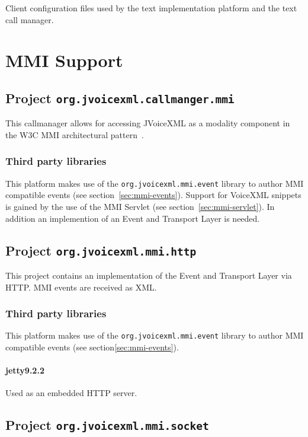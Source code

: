 \documentclass[11pt,a4paper]{article}
\begin{document}
Client configuration files used by the text implementation platform and the text call manager.

\section {MMI Support}

\subsection{Project \texttt{org.jvoicexml.callmanger.mmi}}

This callmanager allows for accessing JVoiceXML as a modality component in
the W3C MMI architectural pattern~\cite{w3c:2012:mmi_arch}.

\subsubsection{Third party libraries}

This platform makes use of the \lstinline{org.jvoicexml.mmi.event} library
to author MMI compatible events (see section~\ref{sec:mmi-events}).
Support for VoiceXML snippets is gained by the use of the MMI Servlet
(see section~\ref{sec:mmi-servlet}).
In addition an implemention of an Event and Transport Layer is needed.

\subsection{Project \texttt{org.jvoicexml.mmi.http}}

This project contains an implementation of the Event and Transport Layer
via HTTP. MMI events are received as XML.

\subsubsection{Third party libraries}

This platform makes use of the \lstinline{org.jvoicexml.mmi.event} library
to author MMI compatible events (see section\ref{sec:mmi-events}).

\paragraph{jetty9.2.2}

Used as an embedded HTTP server.

\subsection{Project \texttt{org.jvoicexml.mmi.socket}}
\end{document}
